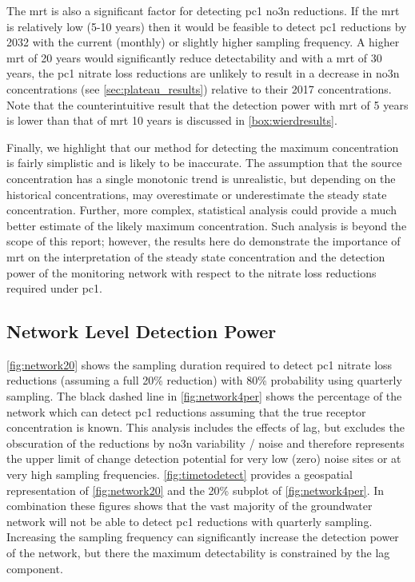 The \gls{mrt} is also a significant factor for detecting \gls{pc1} \gls{no3n} reductions.
If the \gls{mrt} is relatively low (5-10 years) then it would be feasible to detect \gls{pc1} reductions by 2032 with the current (monthly) or slightly higher sampling frequency.
A higher \gls{mrt} of 20 years would significantly reduce detectability and with a \gls{mrt} of 30 years, the \gls{pc1} nitrate loss reductions are unlikely to result in a decrease in \gls{no3n} concentrations (see \autoref{sec:plateau_results}) relative to their 2017 concentrations.
Note that the counterintuitive result that the detection power with \gls{mrt} of 5 years is lower than that of \gls{mrt} 10 years is discussed in \autoref{box:wierdresults}.

Finally, we highlight that our method for detecting the maximum concentration is fairly simplistic and is likely to be inaccurate.
The assumption that the source concentration has a single monotonic trend is unrealistic, but depending on the historical concentrations, may overestimate or underestimate the steady state concentration.
Further, more complex, statistical analysis could provide a much better estimate of the likely maximum concentration.
Such analysis is beyond the scope of this report; however, the results here do demonstrate the importance of \gls{mrt} on the interpretation of the steady state concentration and the detection power of the monitoring network with respect to the nitrate loss reductions required under \gls{pc1}.

\subsection[Network Detection Power]{Network Level Detection Power} \label{sec:network_results}

\autoref{fig:network20} shows the sampling duration required to detect \gls{pc1} nitrate loss reductions (assuming a full 20\% reduction) with 80\% probability using quarterly sampling.
The black dashed line in \autoref{fig:network4per} shows the percentage of the network which can detect \gls{pc1} reductions assuming that the true receptor concentration is known.
This analysis includes the effects of lag, but excludes the obscuration of the reductions by \gls{no3n} variability / noise and therefore represents the upper limit of change detection potential for very low (zero) noise sites or at very high sampling frequencies.
\autoref{fig:timetodetect} provides a geospatial representation of \autoref{fig:network20} and the 20\% subplot of \autoref{fig:network4per}.
In combination these figures shows that the vast majority of the groundwater network will not be able to detect \gls{pc1} reductions with quarterly sampling.
Increasing the sampling frequency can significantly increase the detection power of the network, but there the maximum detectability is constrained by the lag component.

